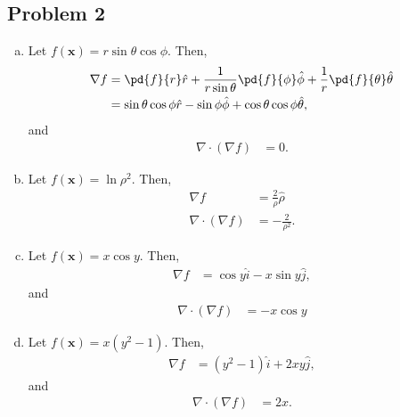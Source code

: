 \documentclass[10pt]{mypackage}
\begin{document}
\subsection{Problem 2}%
\begin{enumerate}[(a)]
  \item Let $f\left(\mathbf{x}\right) = r\sin\theta\cos\phi$. Then,
    \begin{align*}
      \nabla f &= \pd{f}{r}\hat{r} + \frac{1}{r\sin\theta}\pd{f}{\phi}\hat{\phi} + \frac{1}{r}\pd{f}{\theta}\hat{\theta}\\
               &= \sin\theta\cos\phi\hat{r} - \sin\phi\hat{\phi} + \cos\theta\cos\phi\hat{\theta},
    \end{align*}
    and
    \begin{align*}
      \nabla \cdot \left(\nabla f\right) &= 0.
    \end{align*}
  \item Let $f\left(\mathbf{x}\right) = \ln \rho^2$. Then,
    \begin{align*}
      \nabla f &= \frac{2}{\rho}\hat{\rho}\\
      \nabla \cdot \left(\nabla f\right) &= -\frac{2}{\rho^2}.
    \end{align*}
  \item Let $f\left(\mathbf{x}\right) = x\cos y$. Then,
    \begin{align*}
      \nabla f &= \cos y \hat{i} - x\sin y \hat{j},
    \end{align*}
    and
    \begin{align*}
      \nabla \cdot \left(\nabla f\right) &= -x\cos y
    \end{align*}
  \item Let $f\left(\mathbf{x}\right) = x\left(y^2 - 1\right)$. Then,
    \begin{align*}
      \nabla f &= \left(y^2 - 1\right)\hat{i} + 2xy\hat{j},
    \end{align*}
    and
    \begin{align*}
      \nabla \cdot \left(\nabla f\right) &= 2x.
    \end{align*}
\end{enumerate}
\end{document}
